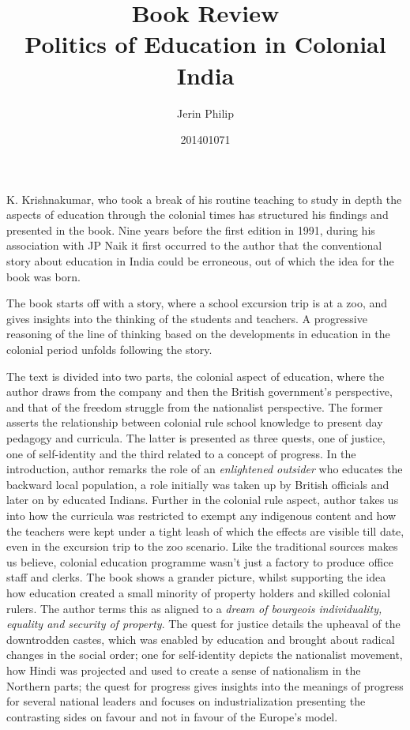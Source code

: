 \documentclass[a4paper,twocolumn]{article}
\title{Book Review\\ Politics of Education in Colonial India}
\author{Jerin Philip}
\date{201401071}
\begin{document}
\maketitle


    K. Krishnakumar, who took a break of his routine
    teaching to study in depth the aspects of education
    through the colonial times has structured his
    findings and presented in the book.  Nine years
    before the first edition in 1991, during his
    association with JP Naik it first occurred to the
    author that the conventional story about education
    in India could be erroneous, out of which the idea
    for the book was born.

    The book starts off with a story, where a school
    excursion trip is at a zoo, and gives insights into
    the thinking of the students and teachers. A
    progressive reasoning of the line of thinking based
    on the developments in education in the colonial
    period unfolds following the story.

    The text is divided into two parts, the colonial
    aspect of education, where the author draws from the
    company and then the British government's
    perspective, and that of the freedom struggle from
    the nationalist perspective. The former asserts the
    relationship between colonial rule school knowledge
    to present day pedagogy and curricula. The latter is
    presented as three quests, one of justice, one of
    self-identity and the third related to a concept of
    progress. In the introduction, author remarks the
    role of an \emph{enlightened outsider} who educates
    the backward local population, a role initially was
    taken up by British officials and later on by
    educated Indians. Further in the colonial rule
    aspect, author takes us into how the curricula was
    restricted to exempt any indigenous content and how
    the teachers were kept under a tight leash of which
    the effects are visible till date, even in the
    excursion trip to the zoo scenario. Like the
    traditional sources makes us believe, colonial
    education programme wasn't just a factory to produce
    office staff and clerks. The book shows a grander
    picture, whilst supporting the idea how education
    created  a small minority of property holders and
    skilled colonial rulers. The author terms this as
    aligned to a \emph{dream of bourgeois individuality,
    equality and security of property}. The quest for
    justice details the upheaval of the downtrodden
    castes, which was enabled by education and brought
    about radical changes in the social order; one for
    self-identity depicts the nationalist movement, how
    Hindi was projected and used to create a sense of
    nationalism in the Northern parts; the quest for
    progress gives insights into the meanings of
    progress for several national leaders and focuses
    on industrialization presenting the contrasting
    sides on favour and not in favour of the Europe's
    model.
\end{document}
